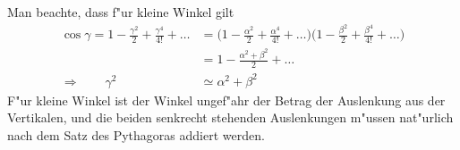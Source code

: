 \begin{diskussion}
Man beachte, dass f"ur kleine Winkel gilt
\begin{align*}
\cos\gamma=
1-\frac{\gamma^2}2+\frac{\gamma^4}{4!}+\dots
&=
\biggl(
1-\frac{\alpha^2}2+\frac{\alpha^4}{4!}+\dots
\biggl)
\biggl(
1-\frac{\beta^2}2+\frac{\beta^4}{4!}+\dots
\biggl)
\\
&=
1-\frac{\alpha^2+\beta^2}2+\dots
\\
\Rightarrow\qquad
\gamma^2&\simeq\alpha^2+\beta^2
\end{align*}
F"ur kleine Winkel ist der Winkel ungef"ahr der Betrag der Auslenkung aus der
Vertikalen, und die beiden senkrecht stehenden Auslenkungen m"ussen nat"urlich
nach dem Satz des Pythagoras addiert werden.
\end{diskussion}
